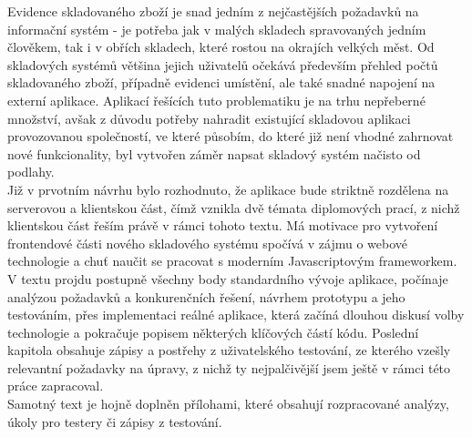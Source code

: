 Evidence skladovaného zboží je snad jedním z nejčastějších požadavků na informační systém - je potřeba jak v malých skladech spravovaných jedním člověkem, tak i v obřích skladech, které rostou na okrajích velkých měst. Od skladových systémů většina jejich uživatelů očekává především přehled počtů skladovaného zboží, případně evidenci umístění, ale také snadné napojení na externí aplikace. Aplikací řešících tuto problematiku je na trhu nepřeberné množství, avšak z důvodu potřeby nahradit existující skladovou aplikaci provozovanou společností, ve které působím, do které již není vhodné zahrnovat nové funkcionality, byl vytvořen záměr napsat skladový systém načisto od podlahy.\\
Již v prvotním návrhu bylo rozhodnuto, že aplikace bude striktně rozdělena na serverovou a klientskou část, čímž vznikla dvě témata diplomových prací, z nichž klientskou část řeším právě v rámci tohoto textu. Má motivace pro vytvoření frontendové části nového skladového systému spočívá v zájmu o webové technologie a chuť naučit se pracovat s moderním Javascriptovým frameworkem.\\
V textu projdu postupně všechny body standardního vývoje aplikace, počínaje analýzou požadavků a konkurenčních řešení, návrhem prototypu a jeho testováním, přes implementaci reálné aplikace, která začíná dlouhou diskusí volby technologie a pokračuje popisem některých klíčových částí kódu. Poslední kapitola obsahuje zápisy a postřehy z uživatelského testování, ze kterého vzešly relevantní požadavky na úpravy, z nichž ty nejpalčivější jsem ještě v rámci této práce zapracoval.\\
Samotný text je hojně doplněn přílohami, které obsahují rozpracované analýzy, úkoly pro testery či zápisy z testování.
